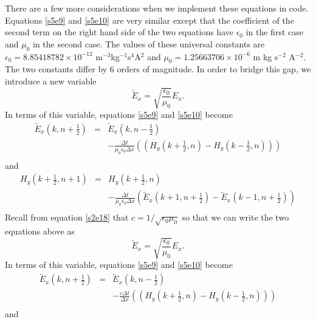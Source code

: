 \documentclass[11pt]{article}
\numberwithin{equation}{section}
\begin{document}
There are a few more considerations when we implement these equations in code.
Equations \eqref{s5e9} and \eqref{s5e10} are very similar except that the
coefficient of the second term on the right hand side of the two equations
have $\epsilon_0$ in the first case and $\mu_0$ in the second case. The
values of these universal constants are $\epsilon_0 = 8.85418782\times 10^{-12}
$ m$^{-3}$kg$^{-1}$s$^4$A$^2$ and $\mu_0=1.25663706 \times 10^{-6}$ m kg
s$^{-2}$ A$^{-2}$. The two constants differ by $6$ orders of magnitude. In
order to bridge this gap, we introduce a new variable
\begin{equation}\label{s5e11}
\tilde{E}_x = \sqrt{\frac{\epsilon_0}{\mu_0}}E_x.
\end{equation}
In terms of this variable, equations \eqref{s5e9} and \eqref{s5e10} become
\begin{eqnarray}
\tilde{E}_x\left(k ,n+\frac{1}{2}\right) &=& \tilde{E}_x\left(k ,
n-\frac{1}{2}\right) \nonumber \\
 & & -\frac{\Delta t}{\mu_0\epsilon_0\Delta x}\left(\left(
H_y\left(k + \frac{1}{2}, n\right) - H_y\left(k - \frac{1}{2}, n\right)\right)
\right) \nonumber \\
 & & \label{s5e12}
\end{eqnarray}
and
\begin{eqnarray}
H_y\left(k+\frac{1}{2},n+1\right) &=& H_y\left(k+\frac{1}{2}, n\right) 
\nonumber \\
 & & -\frac{\Delta t}{\mu_0\epsilon_0\Delta x}\left(
\tilde{E}_x\left(k + 1, n + \frac{1}{2}\right) - \tilde{E}_x\left(k - 1, n+\frac{1}{2}\right)
\right) \nonumber \\
 & & \label{s5e13}
\end{eqnarray}
Recall from equation \eqref{s2e18} that $c = 1/\sqrt{\epsilon_0\mu_0}$ so that
we can write the two equations above as
\begin{equation}\label{s5e14}
\tilde{E}_x = \sqrt{\frac{\epsilon_0}{\mu_0}}E_x.
\end{equation}
In terms of this variable, equations \eqref{s5e9} and \eqref{s5e10} become
\begin{eqnarray}
\tilde{E}_x\left(k ,n+\frac{1}{2}\right) &=& \tilde{E}_x\left(k ,
n-\frac{1}{2}\right) \nonumber \\
 & & -\frac{c \Delta t}{\Delta x}\left(\left(
H_y\left(k + \frac{1}{2}, n\right) - H_y\left(k - \frac{1}{2}, n\right)\right)
\right) \nonumber \\
 & & \label{s5e15}
\end{eqnarray}
and
\end{document}
